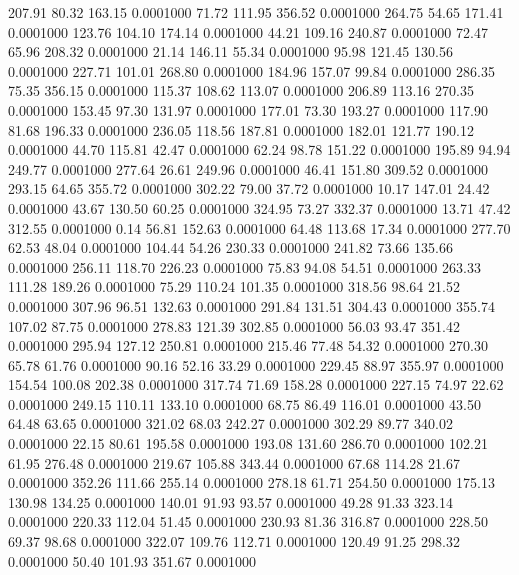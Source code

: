  207.91   80.32  163.15   0.0001000
  71.72  111.95  356.52   0.0001000
 264.75   54.65  171.41   0.0001000
 123.76  104.10  174.14   0.0001000
  44.21  109.16  240.87   0.0001000
  72.47   65.96  208.32   0.0001000
  21.14  146.11   55.34   0.0001000
  95.98  121.45  130.56   0.0001000
 227.71  101.01  268.80   0.0001000
 184.96  157.07   99.84   0.0001000
 286.35   75.35  356.15   0.0001000
 115.37  108.62  113.07   0.0001000
 206.89  113.16  270.35   0.0001000
 153.45   97.30  131.97   0.0001000
 177.01   73.30  193.27   0.0001000
 117.90   81.68  196.33   0.0001000
 236.05  118.56  187.81   0.0001000
 182.01  121.77  190.12   0.0001000
  44.70  115.81   42.47   0.0001000
  62.24   98.78  151.22   0.0001000
 195.89   94.94  249.77   0.0001000
 277.64   26.61  249.96   0.0001000
  46.41  151.80  309.52   0.0001000
 293.15   64.65  355.72   0.0001000
 302.22   79.00   37.72   0.0001000
  10.17  147.01   24.42   0.0001000
  43.67  130.50   60.25   0.0001000
 324.95   73.27  332.37   0.0001000
  13.71   47.42  312.55   0.0001000
   0.14   56.81  152.63   0.0001000
  64.48  113.68   17.34   0.0001000
 277.70   62.53   48.04   0.0001000
 104.44   54.26  230.33   0.0001000
 241.82   73.66  135.66   0.0001000
 256.11  118.70  226.23   0.0001000
  75.83   94.08   54.51   0.0001000
 263.33  111.28  189.26   0.0001000
  75.29  110.24  101.35   0.0001000
 318.56   98.64   21.52   0.0001000
 307.96   96.51  132.63   0.0001000
 291.84  131.51  304.43   0.0001000
 355.74  107.02   87.75   0.0001000
 278.83  121.39  302.85   0.0001000
  56.03   93.47  351.42   0.0001000
 295.94  127.12  250.81   0.0001000
 215.46   77.48   54.32   0.0001000
 270.30   65.78   61.76   0.0001000
  90.16   52.16   33.29   0.0001000
 229.45   88.97  355.97   0.0001000
 154.54  100.08  202.38   0.0001000
 317.74   71.69  158.28   0.0001000
 227.15   74.97   22.62   0.0001000
 249.15  110.11  133.10   0.0001000
  68.75   86.49  116.01   0.0001000
  43.50   64.48   63.65   0.0001000
 321.02   68.03  242.27   0.0001000
 302.29   89.77  340.02   0.0001000
  22.15   80.61  195.58   0.0001000
 193.08  131.60  286.70   0.0001000
 102.21   61.95  276.48   0.0001000
 219.67  105.88  343.44   0.0001000
  67.68  114.28   21.67   0.0001000
 352.26  111.66  255.14   0.0001000
 278.18   61.71  254.50   0.0001000
 175.13  130.98  134.25   0.0001000
 140.01   91.93   93.57   0.0001000
  49.28   91.33  323.14   0.0001000
 220.33  112.04   51.45   0.0001000
 230.93   81.36  316.87   0.0001000
 228.50   69.37   98.68   0.0001000
 322.07  109.76  112.71   0.0001000
 120.49   91.25  298.32   0.0001000
  50.40  101.93  351.67   0.0001000
